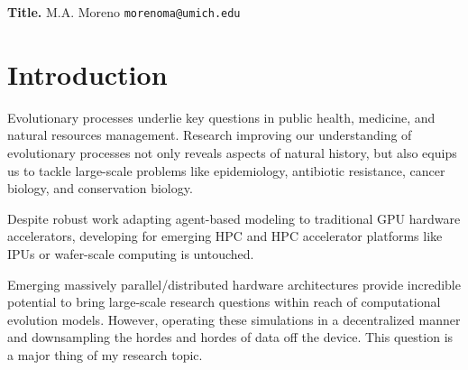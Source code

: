 


\textbf{Title.} M.A. Moreno \texttt{morenoma@umich.edu}

\section{Introduction}
Evolutionary processes underlie key questions in public health, medicine, and natural resources management. Research improving our understanding of evolutionary processes not only reveals aspects of natural history, but also equips us to tackle large-scale problems like epidemiology, antibiotic resistance, cancer biology, and conservation biology.

Despite robust work adapting agent-based modeling to traditional GPU hardware accelerators, developing for emerging HPC and HPC accelerator platforms like IPUs or wafer-scale computing is untouched.

Emerging massively parallel/distributed hardware architectures provide incredible potential to bring large-scale research questions within reach of computational evolution models. However, operating these simulations in a decentralized manner and downsampling the hordes and hordes of data off the device. This question is a major thing of my research topic.

